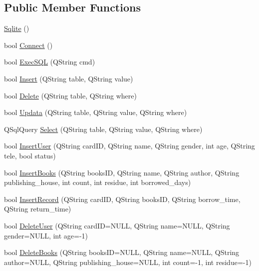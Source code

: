 \subsection*{Public Member Functions}
\begin{DoxyCompactItemize}
\item 
\mbox{\hyperlink{class_sqlite_a8aef4e64531e1522f892c0c6ec69cdff}{Sqlite}} ()
\item 
bool \mbox{\hyperlink{class_sqlite_aa93509c1e19a7d486f4f38ff4bc78a89}{Connect}} ()
\item 
bool \mbox{\hyperlink{class_sqlite_a3d4be952cdb19b674a80dacd78e2873a}{Exec\+S\+QL}} (Q\+String cmd)
\item 
bool \mbox{\hyperlink{class_sqlite_a8d0c32df6db2b0ca13695cfa8780840e}{Insert}} (Q\+String table, Q\+String value)
\item 
bool \mbox{\hyperlink{class_sqlite_a772711beeceff7a567192e19abccfed4}{Delete}} (Q\+String table, Q\+String where)
\item 
bool \mbox{\hyperlink{class_sqlite_ae014031d1e0b0d9c412fb72ddc5a0043}{Updata}} (Q\+String table, Q\+String value, Q\+String where)
\item 
Q\+Sql\+Query \mbox{\hyperlink{class_sqlite_a9a39cca147a504c82e98261707aa1e8d}{Select}} (Q\+String table, Q\+String value, Q\+String where)
\item 
bool \mbox{\hyperlink{class_sqlite_aaaa7d53dd288728640cde95e264f31f1}{Insert\+User}} (Q\+String card\+ID, Q\+String name, Q\+String gender, int age, Q\+String tele, bool status)
\item 
bool \mbox{\hyperlink{class_sqlite_a51b44b9e10f90888b36088adb6ec6226}{Insert\+Books}} (Q\+String books\+ID, Q\+String name, Q\+String author, Q\+String publishing\+\_\+house, int count, int residue, int borrowed\+\_\+days)
\item 
bool \mbox{\hyperlink{class_sqlite_a7271bf0e8252a9dc0969872faea228b4}{Insert\+Record}} (Q\+String card\+ID, Q\+String books\+ID, Q\+String borrow\+\_\+time, Q\+String return\+\_\+time)
\item 
bool \mbox{\hyperlink{class_sqlite_af2b581d800d01e1f1281d98ec1341ddd}{Delete\+User}} (Q\+String card\+ID=N\+U\+LL, Q\+String name=N\+U\+LL, Q\+String gender=N\+U\+LL, int age=-\/1)
\item 
bool \mbox{\hyperlink{class_sqlite_a8a83c22e036086edf84758fb0f6cfc56}{Delete\+Books}} (Q\+String books\+ID=N\+U\+LL, Q\+String name=N\+U\+LL, Q\+String author=N\+U\+LL, Q\+String publishing\+\_\+house=N\+U\+LL, int count=-\/1, int residue=-\/1)

\end{DoxyCompactItemize}

